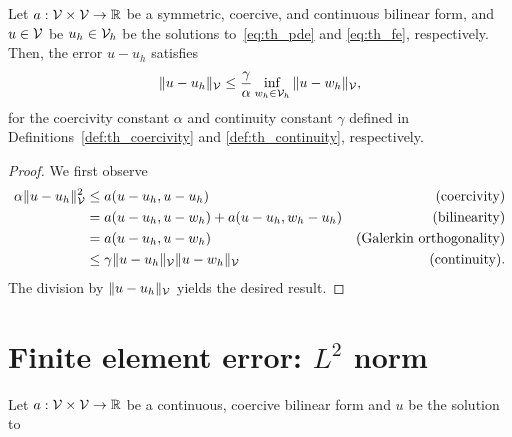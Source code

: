 \begin{lemma}[Cea's]
  Let $a: \mathcal{V} \times \mathcal{V} \to \mathbb{R}$ be a symmetric, coercive, and continuous bilinear form, and $u \in \mathcal{V}$ be $u_h \in \mathcal{V}_h$ be the solutions to~\eqref{eq:th_pde} and \eqref{eq:th_fe}, respectively. Then, the error $u - u_h$ satisfies
  \begin{equation*}
    \| u - u_h \|_{\mathcal{V}} \leq \frac{\gamma}{\alpha} \inf_{w_h \in \mathcal{V}_h} \| u - w_h \|_{\mathcal{V}},
  \end{equation*}
  for the coercivity constant $\alpha$ and continuity constant $\gamma$ defined in Definitions~\ref{def:th_coercivity} and \ref{def:th_continuity}, respectively.
  \begin{proof}
    We first observe
    \begin{align*}
      \alpha \| u - u_h \|^2_{\mathcal{V}}
      &\leq a(u - u_h, u - u_h) & \text{(coercivity)} \\
      &= a(u - u_h, u - w_h) + a(u - u_h, w_h - u_h) &\text{(bilinearity)} \\
      &= a(u - u_h, u - w_h) &\text{(Galerkin orthogonality)} \\
      &\leq \gamma \| u - u_h \|_{\mathcal{V}} \| u - w_h \|_{\mathcal{V}} &\text{(continuity)}.
    \end{align*}
    The division by $\| u - u_h \|_{\mathcal{V}}$ yields the desired result.
  \end{proof}
\end{lemma}


\section{Finite element error: $L^2$ norm}

\begin{lemma}
  Let $a: \mathcal{V} \times \mathcal{V} \to \mathbb{R}$ be a continuous, coercive bilinear form and $u$ be the solution to 
\end{lemma}

